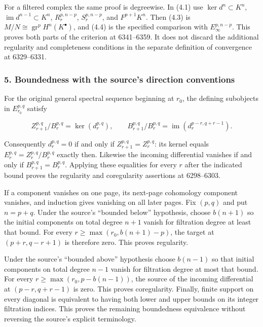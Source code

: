 For a filtered complex the same proof is degreewise. In (4.1) use \(\ker d^n\subset K^n\), \(\operatorname{im}d^{n-1}\subset K^n\), \(R_r^{p,n-p}\), \(S_r^{p,n-p}\), and \(F^{p+1}K^n\). Then (4.3) is \(M/N\cong\operatorname{gr}^pH^n(K^\bullet)\), and (4.4) is the specified comparison with \(E_\infty^{p,n-p}\). This proves both parts of the criterion at 6341--6359. It does not discard the additional regularity and completeness conditions in the separate definition of convergence at 6329--6331.

\subsubsection{5. Boundedness with the source's direction conventions}\label{boundedness-with-the-sources-direction-conventions}

For the original general spectral sequence beginning at \(r_0\), the defining subobjects in \(E_{r_0}^{p,q}\) satisfy

\[
Z_{r+1}^{p,q}/B_r^{p,q}=\ker(d_r^{p,q}),\qquad
B_{r+1}^{p,q}/B_r^{p,q}
=\operatorname{im}(d_r^{p-r,q+r-1}).
\]

Consequently \(d_r^{p,q}=0\) if and only if \(Z_{r+1}^{p,q}=Z_r^{p,q}\): its kernel equals \(E_r^{p,q}=Z_r^{p,q}/B_r^{p,q}\) exactly then. Likewise the incoming differential vanishes if and only if \(B_{r+1}^{p,q}=B_r^{p,q}\). Applying these equalities for every \(r\) after the indicated bound proves the regularity and coregularity assertions at 6298--6303.

If a component vanishes on one page, its next-page cohomology component vanishes, and induction gives vanishing on all later pages. Fix \((p,q)\) and put \(n=p+q\). Under the source's ``bounded below'' hypothesis, choose \(b(n+1)\) so the initial components on total degree \(n+1\) vanish for filtration degree at least that bound. For every \(r\geq\max(r_0,b(n+1)-p)\), the target at \((p+r,q-r+1)\) is therefore zero. This proves regularity.

Under the source's ``bounded above'' hypothesis choose \(b(n-1)\) so that initial components on total degree \(n-1\) vanish for filtration degree at most that bound. For every \(r\geq\max(r_0,p-b(n-1))\), the source of the incoming differential at \((p-r,q+r-1)\) is zero. This proves coregularity. Finally, finite support on every diagonal is equivalent to having both lower and upper bounds on its integer filtration indices. This proves the remaining boundedness equivalence without reversing the source's explicit terminology.

